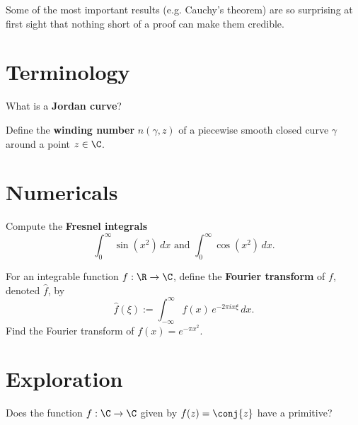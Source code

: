 \documentclass{homework}
\author{Jim Fowler}
\begin{document}
\maketitle

\begin{inspiration}
Some of the most important results (e.g. Cauchy's theorem) are so surprising at first sight that nothing short of a proof can make them credible.
\end{inspiration}

\section{Terminology}

\begin{problem}
  What is a \textbf{Jordan curve}?
\end{problem}

\begin{problem}
  Define the \textbf{winding number} $n(\gamma,z)$ of a piecewise
  smooth closed curve $\gamma$ around a point $z \in \C$.
\end{problem}

\section{Numericals}

\begin{problem} Compute the \textbf{Fresnel integrals}
  \[
    \int_0^\infty \sin \left( x^2 \right) \, dx \mbox{ and } \int_0^\infty \cos \left( x^2 \right) \, dx.
  \]
\end{problem}

\begin{problem}\label{fourier-transform-itself}For an integrable function $f : \R \to \C$, define the
  \textbf{Fourier transform} of $f$, denoted $\hat{f}$, by
  \[
    {\hat {f}}(\xi ) := \int _{-\infty }^{\infty} f(x) \, e^{-2\pi ix \xi} \,dx.
  \]
  Find the Fourier transform of $f(x) = e^{-\pi x^2}$.
\end{problem}

\section{Exploration}

\begin{problem}
  Does the function $f : \C \to \C$ given by $f(z) = \conj{z}$ have a
  primitive?
\end{problem}
\end{document}
